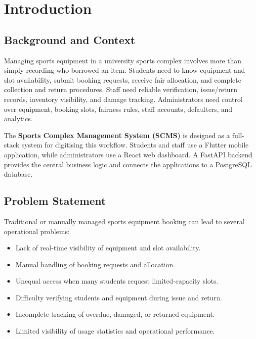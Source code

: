 \documentclass[12pt,a4paper,oneside]{report}
\begin{document}
\chapter{Introduction}

\section{Background and Context}

Managing sports equipment in a university sports complex involves more than simply recording who borrowed an item. Students need to know equipment and slot availability, submit booking requests, receive fair allocation, and complete collection and return procedures. Staff need reliable verification, issue/return records, inventory visibility, and damage tracking. Administrators need control over equipment, booking slots, fairness rules, staff accounts, defaulters, and analytics.

The \textbf{Sports Complex Management System (SCMS)} is designed as a full-stack system for digitising this workflow. Students and staff use a Flutter mobile application, while administrators use a React web dashboard. A FastAPI backend provides the central business logic and connects the applications to a PostgreSQL database.

\section{Problem Statement}

Traditional or manually managed sports equipment booking can lead to several operational problems:

\begin{itemize}
    \item Lack of real-time visibility of equipment and slot availability.
    \item Manual handling of booking requests and allocation.
    \item Unequal access when many students request limited-capacity slots.
    \item Difficulty verifying students and equipment during issue and return.
    \item Incomplete tracking of overdue, damaged, or returned equipment.
    \item Limited visibility of usage statistics and operational performance.
\end{itemize}
\end{document}
